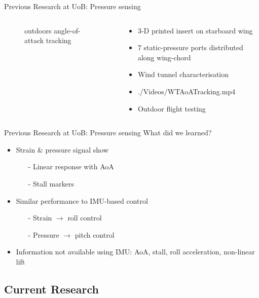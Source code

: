 \documentclass[aspectratio=169]{beamer}            %
\begin{document}
\begin{frame}{Previous Research at UoB: Pressure sensing}
\begin{columns}
\begin{column}{0.6\textwidth}
{\begin{figure}[!htb]
          \caption{outdoors angle-of-attack tracking}
          \label{Fig:PressSens_AoATracking}
        \end{figure}
			}
		\end{column}
		\begin{column}{0.4\textwidth}
		  \begin{itemize}
				\item<2-> 3-D printed insert on starboard wing
				\item<3-> 7 static-pressure ports distributed along wing-chord
				\item<4-> Wind tunnel characterisation
				\item<5-> 
					{./Videos/WTAoATracking.mp4}
				\item<6-> Outdoor flight testing
			\end{itemize}
		\end{column}
  \end{columns}
	
\end{frame}

\begin{frame}{Previous Research at UoB: Pressure sensing}
  What did we learned?
	\pause
    \begin{itemize}[<+->]
      \item Strain \& pressure signal show
			\begin{itemize}[<+->]
			  \item[-]Linear response with AoA
			  \item[-]Stall markers
			\end{itemize}
			\item Similar performance to IMU-based control
			\begin{itemize}[<+->]
			  \item[-]Strain ${\rightarrow}$ roll control
        \item[-]Pressure ${\rightarrow}$ pitch control
			\end{itemize}
			\item Information not available using IMU: AoA, stall, roll acceleration, non-linear lift
    \end{itemize}
\end{frame}

\subsection[Current Research]{Current Research}
\end{document}
